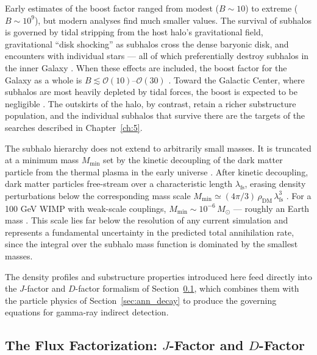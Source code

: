 Early estimates of the boost factor ranged from modest ($B \sim 10$) to extreme ($B \sim 10^9$), but modern analyses find much smaller values.
The survival of subhalos is governed by tidal stripping from the host halo's gravitational field, gravitational ``disk shocking'' as subhalos cross the dense baryonic disk, and encounters with individual stars --- all of which preferentially destroy subhalos in the inner Galaxy \cite{Cirelli:2024ssz,Sanchez-Conde:2013yxa}.
When these effects are included, the boost factor for the Galaxy as a whole is $B \lesssim \mathcal{O}(10)$--$\mathcal{O}(30)$ \cite{Sanchez-Conde:2013yxa,Moline:2016pbm,Cirelli:2024ssz}.
Toward the Galactic Center, where subhalos are most heavily depleted by tidal forces, the boost is expected to be negligible \cite{Cirelli:2024ssz,Sanchez-Conde:2013yxa}.
The outskirts of the halo, by contrast, retain a richer substructure population, and the individual subhalos that survive there are the targets of the searches described in Chapter~\ref{ch:5}.

The subhalo hierarchy does not extend to arbitrarily small masses.
It is truncated at a minimum mass $M_\text{min}$ set by the kinetic decoupling of the dark matter particle from the thermal plasma in the early universe \cite{Cirelli:2024ssz}.
After kinetic decoupling, dark matter particles free-stream over a characteristic length $\lambda_\text{fs}$, erasing density perturbations below the corresponding mass scale $M_\text{min} \simeq (4\pi/3)\, \rho_\text{DM}\, \lambda_\text{fs}^3$ \cite{Cirelli:2024ssz}.
For a 100 GeV WIMP with weak-scale couplings, $M_\text{min} \sim 10^{-6}\, M_\odot$ --- roughly an Earth mass \cite{Cirelli:2024ssz}.
This scale lies far below the resolution of any current simulation and represents a fundamental uncertainty in the predicted total annihilation rate, since the integral over the subhalo mass function is dominated by the smallest masses.

The density profiles and substructure properties introduced here feed directly into the $J$-factor and $D$-factor formalism of Section~\ref{sec:jfactor}, which combines them with the particle physics of Section~\ref{sec:ann_decay} to produce the governing equations for gamma-ray indirect detection.

\subsection{The Flux Factorization: $J$-Factor and $D$-Factor}
\label{sec:jfactor}

